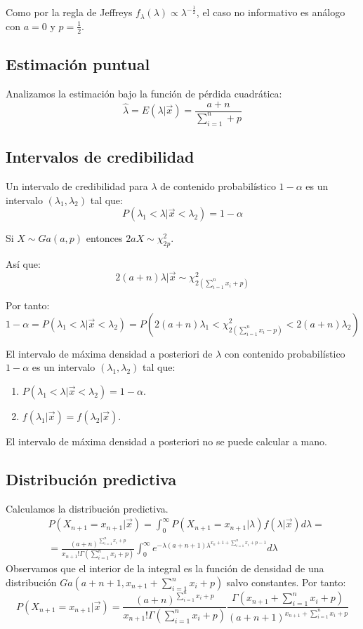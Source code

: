 Como por la regla de Jeffreys $f_\lambda(\lambda) \propto \lambda^{-\frac{1}{2}}$, el caso no informativo es análogo con $a = 0$ y $p = \frac{1}{2}$.

\subsection*{Estimación puntual}
Analizamos la estimación bajo la función de pérdida cuadrática:
$$\hat{\lambda} = E(\lambda|\vec{x}) = \frac{a+n}{\sum_{i=1}^n + p}$$

\subsection*{Intervalos de credibilidad}
Un intervalo de credibilidad para $\lambda$ de contenido probabilístico $1-\alpha$ es un intervalo $(\lambda_1, \lambda_2)$ tal que:
$$P(\lambda_1 < \lambda|\vec{x} < \lambda_2) = 1-\alpha$$

\begin{note}
    Si $X \sim Ga(a, p)$ entonces $2aX \sim \chi^2_{2p}$.
\end{note}

Así que:
$$2(a+n)\lambda|\vec{x} \sim \chi^2_{2(\sum_{i=1}^n x_i + p)}$$

Por tanto:
$$1-\alpha = P(\lambda_1 < \lambda|\vec{x} < \lambda_2) = P(2(a+n)\lambda_1 < \chi^2_{2(\sum_{i=1}^n x_i - p)} < 2(a+n)\lambda_2)$$

El intervalo de máxima densidad a posteriori de $\lambda$ con contenido probabilístico $1-\alpha$ es un intervalo $(\lambda_1, \lambda_2)$ tal que:
\begin{enumerate}
    \item $P(\lambda_1 < \lambda|\vec{x} < \lambda_2) = 1-\alpha$.
    \item $f(\lambda_1|\vec{x}) = f(\lambda_2|\vec{x})$.
\end{enumerate}

\begin{note}
    El intervalo de máxima densidad a posteriori no se puede calcular a mano.
\end{note}

\subsection*{Distribución predictiva}
Calculamos la distribución predictiva.
\begin{align*}
     & P(X_{n+1} = x_{n+1}|\vec{x}) = \int_0^\infty P(X_{n+1} = x_{n+1}|\lambda)f(\lambda|\vec{x})d\lambda =                                                         \\
     & = \frac{(a+n)^{\sum_{i=1}^n x_i + p}}{x_{n+1}!\Gamma(\sum_{i=1}^n x_i + p)} \int_0^\infty e^{-\lambda(a+n+1)\lambda^{x_n+1 + \sum_{i=1}^n x_i + p-1}}d\lambda
\end{align*}
Observamos que el interior de la integral es la función de densidad de una distribución $Ga(a+n+1, x_{n+1} + \sum_{i=1}^n x_i + p)$ salvo constantes.
Por tanto:
$$P(X_{n+1} = x_{n+1}|\vec{x}) = \frac{(a+n)^{\sum_{i=1}^n x_i + p}}{x_{n+1}!\Gamma(\sum_{i=1}^n x_i + p)} \frac{\Gamma(x_{n+1} + \sum_{i=1}^n x_i + p)}{(a+n+1)^{x_{n+1} + \sum_{i=1}^n x_i + p}}$$